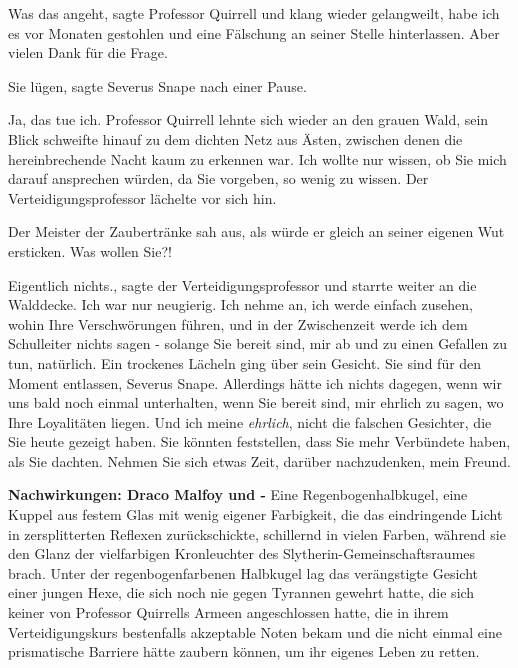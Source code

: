 \glqq Was das angeht\grqq{}, sagte Professor Quirrell und klang wieder
gelangweilt, \glqq habe ich es vor Monaten gestohlen und eine Fälschung an
seiner Stelle hinterlassen. Aber vielen Dank für die Frage.\grqq{}

\glqq Sie lügen\grqq{}, sagte Severus Snape nach einer Pause.

\glqq Ja, das tue ich.\grqq{} Professor Quirrell lehnte sich wieder an den
grauen Wald, sein Blick schweifte hinauf zu dem dichten Netz aus Ästen, zwischen
denen die hereinbrechende Nacht kaum zu erkennen war. \glqq Ich wollte nur
wissen, ob Sie mich darauf ansprechen würden, da Sie vorgeben, so wenig zu
wissen.\grqq{} Der Verteidigungsprofessor lächelte vor sich hin.

Der Meister der Zaubertränke sah aus, als würde er gleich an seiner eigenen Wut
ersticken. \glqq Was wollen Sie?!\grqq{}

\glqq Eigentlich nichts.\grqq{}, sagte der Verteidigungsprofessor und starrte
weiter an die Walddecke. \glqq Ich war nur neugierig. Ich nehme an, ich werde
einfach zusehen, wohin Ihre Verschwörungen führen, und in der Zwischenzeit werde
ich dem Schulleiter nichts sagen - solange Sie bereit sind, mir ab und zu einen
Gefallen zu tun, natürlich.\grqq{} Ein trockenes Lächeln ging über sein Gesicht.
\glqq Sie sind für den Moment entlassen, Severus Snape. Allerdings hätte ich
nichts dagegen, wenn wir uns bald noch einmal unterhalten, wenn Sie bereit sind,
mir ehrlich zu sagen, wo Ihre Loyalitäten liegen. Und ich meine \emph{ehrlich},
nicht die falschen Gesichter, die Sie heute gezeigt haben. Sie könnten
feststellen, dass Sie mehr Verbündete haben, als Sie dachten. Nehmen Sie sich
etwas Zeit, darüber nachzudenken, mein Freund.\grqq{}

\textbf{Nachwirkungen: Draco Malfoy und -}
Eine Regenbogenhalbkugel, eine Kuppel aus festem Glas mit wenig eigener
Farbigkeit, die das eindringende Licht in zersplitterten Reflexen
zurückschickte, schillernd in vielen Farben, während sie den Glanz der
vielfarbigen Kronleuchter des Slytherin-Gemeinschaftsraumes brach. Unter der
regenbogenfarbenen Halbkugel lag das verängstigte Gesicht einer jungen Hexe, die
sich noch nie gegen Tyrannen gewehrt hatte, die sich keiner von Professor
Quirrells Armeen angeschlossen hatte, die in ihrem Verteidigungskurs bestenfalls
akzeptable Noten bekam und die nicht einmal eine prismatische Barriere hätte
zaubern können, um ihr eigenes Leben zu retten.

